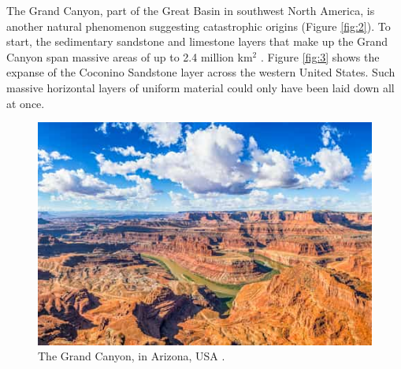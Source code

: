 \documentclass[10pt,twocolumn,letterpaper]{article}
\begin{document}
The Grand Canyon, part of the Great Basin in southwest North America, is another natural phenomenon suggesting catastrophic origins (Figure \ref{fig:2}). To start, the sedimentary sandstone and limestone layers that make up the Grand Canyon span massive areas of up to 2.4 million km$^2$ \cite{21}. Figure \ref{fig:3} shows the expanse of the Coconino Sandstone layer across the western United States. Such massive horizontal layers of uniform material could only have been laid down all at once.

\begin{figure}[b]
\begin{center}
   \includegraphics[width=1\linewidth]{grand-canyon.jpg}
\end{center}
   \caption{The Grand Canyon, in Arizona, USA \cite{49}.}
\label{fig:2}
\label{fig:onecol}
\end{figure}
\end{document}
